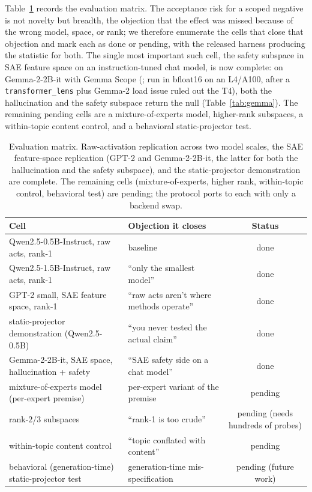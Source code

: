 Table~\ref{tab:matrix} records the evaluation matrix. The acceptance risk for a scoped negative
is not novelty but breadth, the objection that the effect was missed because of the wrong model,
space, or rank; we therefore enumerate the cells that close that objection and mark each as done
or pending, with the released harness producing the statistic for both. The single most
important such cell, the safety subspace in SAE feature space on an instruction-tuned chat model,
is now complete: on Gemma-2-2B-it with Gemma Scope (\citealp{lieberum2024gemmascope}; run in
bfloat16 on an L4/A100, after a \texttt{transformer\_lens} plus Gemma-2 load issue ruled out the
T4), both the hallucination and the safety subspace return the null (Table~\ref{tab:gemma}). The
remaining pending cells are a mixture-of-experts model, higher-rank subspaces, a within-topic
content control, and a behavioral static-projector test.

\begin{table}[t]
\centering
\small
\begin{tabular}{@{}llc@{}}
\toprule
Cell & Objection it closes & Status \\
\midrule
Qwen2.5-0.5B-Instruct, raw acts, rank-1 & baseline & done \\
Qwen2.5-1.5B-Instruct, raw acts, rank-1 & ``only the smallest model'' & done \\
GPT-2 small, SAE feature space, rank-1 & ``raw acts aren't where methods operate'' & done \\
static-projector demonstration (Qwen2.5-0.5B) & ``you never tested the actual claim'' & done \\
Gemma-2-2B-it, SAE space, hallucination + safety & ``SAE safety side on a chat model'' & done \\
mixture-of-experts model (per-expert premise) & per-expert variant of the premise & pending \\
rank-$2$/$3$ subspaces & ``rank-1 is too crude'' & pending (needs hundreds of probes) \\
within-topic content control & ``topic conflated with content'' & pending \\
behavioral (generation-time) static-projector test & generation-time mis-specification & pending (future work) \\
\bottomrule
\end{tabular}
\caption{Evaluation matrix. Raw-activation replication across two model scales, the SAE
feature-space replication (GPT-2 and Gemma-2-2B-it, the latter for both the hallucination and
the safety subspace), and the static-projector demonstration are complete. The remaining cells
(mixture-of-experts, higher rank, within-topic control, behavioral test) are pending; the
protocol ports to each with only a backend swap.}
\label{tab:matrix}
\end{table}

